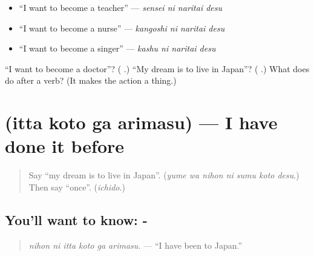 \begin{itemize}
\raggedright
  \item \textquotedblleft{}I want to become a teacher\textquotedblright{} — \emph{sensei ni naritai desu}
  \item \textquotedblleft{}I want to become a nurse\textquotedblright{} — \emph{kangoshi ni naritai desu}
  \item \textquotedblleft{}I want to become a singer\textquotedblright{} — \emph{kashu ni naritai desu}
\end{itemize}

\begin{tcolorbox}[breakable,colback=teal!4,colframe=teal!35!black,title={Before you move on}]
\textquotedblleft{}I want to become a doctor\textquotedblright{}? (\textbf{ }.) \textquotedblleft{}My dream is to live in Japan\textquotedblright{}? (\textbf{   }.) What does \textbf{} do after a verb? (It makes the action a thing.)
\end{tcolorbox}
\section[\texorpdfstring{\ja{いった} \ja{ことが} … (itta koto ga …)}{いった ことが … (itta koto ga …)}]{   (itta koto ga arimasu) — I have done it before}

\label{lesson:JA-C258-itta-koto}



\begin{quote}
Say \textquotedblleft{}my dream is to live in Japan\textquotedblright{}. (\emph{yume wa nihon ni sumu koto desu}.) Then say \textquotedblleft{}once\textquotedblright{}. (\emph{ichido}.)
\end{quote}

\subsection*{You'll want to know: -  }
\begin{quote}
\textbf{   }
\end{quote}

\begin{quote}
\emph{nihon ni itta koto ga arimasu.} — \textquotedblleft{}I have been to Japan.\textquotedblright{}
\end{quote}

